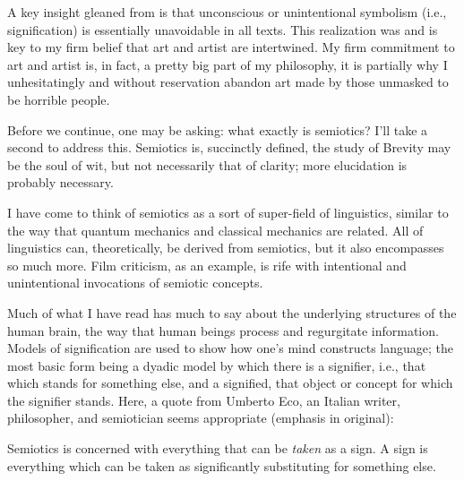 \documentclass[../butidigress.tex]{subfiles}
\begin{document}
A key insight gleaned from  is that unconscious or unintentional symbolism (i.e., signification) is essentially unavoidable in all texts.
This realization was and is key to my firm belief that art and artist are intertwined.
My firm commitment to art and artist is, in fact, a pretty big part of my philosophy, it is partially why I unhesitatingly and without reservation abandon art made by those unmasked to be horrible people.

Before we continue, one may be asking: what exactly is semiotics? I'll take a second to address this.
Semiotics is, succinctly defined, the study of 
Brevity may be the soul of wit, but not necessarily that of clarity; more elucidation is probably necessary.

I have come to think of semiotics as a sort of super-field of linguistics, similar to the way that quantum mechanics and classical mechanics are related.
All of linguistics can, theoretically, be derived from semiotics, but it also encompasses so much more.
Film criticism, as an example, is rife with intentional and unintentional invocations of semiotic concepts.

Much of what I have read has much to say about the underlying structures of the human brain, the way that human beings process and regurgitate information.
Models of signification are used to show how one's mind constructs language; the most basic form being a dyadic model by which there is a signifier, i.e., that which stands for something else, and a signified, that object or concept for which the signifier stands.
Here, a quote from Umberto Eco, an Italian writer, philosopher, and semiotician seems appropriate (emphasis in original):
\begin{displayquote}
Semiotics is concerned with everything that can be \emph{taken} as a sign.
A sign is everything which can be taken as significantly substituting for something else.\autocite{ecosemiotics}
\end{displayquote}
\end{document}
